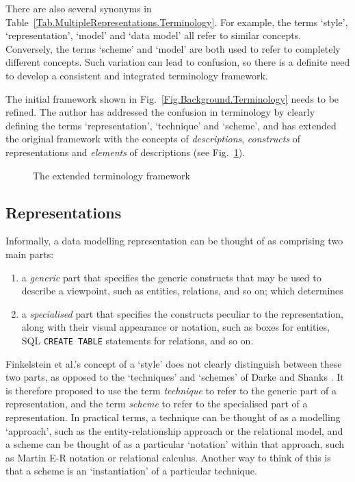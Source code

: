\documentclass[10pt]{llncs}
\begin{document}
There are also several synonyms in Table~\ref{Tab.MultipleRepresentations.Terminology}. For example, the terms `style', `representation', `model' and `data model' all refer to similar concepts. Conversely, the terms `scheme' and `model' are both used to refer to completely different concepts. Such variation can lead to confusion, so there is a definite need to develop a consistent and integrated terminology framework.

The initial framework shown in Fig.~\ref{Fig.Background.Terminology} needs to be refined. The author has addressed the confusion in terminology by clearly defining the terms `representation', `technique' and `scheme', and has extended the original framework with the concepts of \emph{descriptions}, \emph{constructs} of representations and \emph{elements} of descriptions (see Fig.~\ref{Fig.MultipleRepresentations.Terminology}).


\begin{figure}[htb]
	\centering
	\caption{The extended terminology framework}
	\label{Fig.MultipleRepresentations.Terminology}
\end{figure}



\subsection{Representations}
\label{Sec:MultipleRepresentations:Representations:Representations}

Informally, a data modelling representation can be thought of as comprising two main parts:
\begin{enumerate}
	\item a \emph{generic} part that specifies the generic constructs that may be used to describe a viewpoint, such as entities, relations, and so on; which determines
	\item a \emph{specialised} part that specifies the constructs peculiar to the representation, along with their visual appearance or notation, such as boxes for entities, SQL \texttt{CREATE TABLE} statements for relations, and so on.
\end{enumerate}

Finkelstein et al.'s \cite{Fink:ACW:1989} concept of a `style' does not clearly distinguish between these two parts, as opposed to the `techniques' and `schemes' of Darke and Shanks \cite{Dark:P:1995}. It is therefore proposed to use the term \emph{technique} to refer to the generic part of a representation, and the term \emph{scheme} to refer to the specialised part of a representation. In practical terms, a technique can be thought of as a modelling `approach', such as the entity-relationship approach or the relational model, and a scheme can be thought of as a particular `notation' within that approach, such as Martin E-R notation or relational calculus. Another way to think of this is that a scheme is an `instantiation' of a particular technique.
\end{document}
